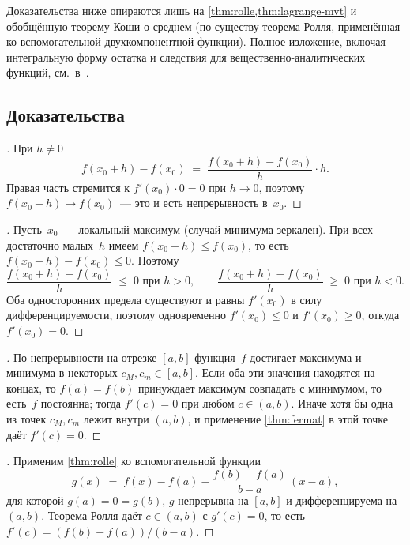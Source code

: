 \begin{remark}
Доказательства ниже опираются лишь на \cref{thm:rolle,thm:lagrange-mvt}
и обобщённую теорему Коши о среднем (по существу теорема Ролля,
применённая ко вспомогательной двухкомпонентной функции). Полное
изложение, включая интегральную форму остатка и следствия для
вещественно-аналитических функций, см.\ в~\cite{Zorich1981}.
\end{remark}

\subsection*{Доказательства}

\begin{proof}[]
При $h \neq 0$
\[
  f(x_0 + h) - f(x_0) \;=\; \frac{f(x_0 + h) - f(x_0)}{h} \cdot h.
\]
Правая часть стремится к $f'(x_0) \cdot 0 = 0$ при $h \to 0$, поэтому
$f(x_0 + h) \to f(x_0)$~--- это и есть непрерывность в~$x_0$.
\end{proof}

\begin{proof}[]
Пусть~$x_0$~--- локальный максимум (случай минимума зеркален). При
всех достаточно малых~$h$ имеем $f(x_0 + h) \le f(x_0)$, то есть
$f(x_0 + h) - f(x_0) \le 0$. Поэтому
\[
  \frac{f(x_0 + h) - f(x_0)}{h} \;\le\; 0 \text{ при } h > 0,
  \qquad
  \frac{f(x_0 + h) - f(x_0)}{h} \;\ge\; 0 \text{ при } h < 0.
\]
Оба односторонних предела существуют и равны $f'(x_0)$ в силу
дифференцируемости, поэтому одновременно $f'(x_0) \le 0$ и
$f'(x_0) \ge 0$, откуда $f'(x_0) = 0$.
\end{proof}

\begin{proof}[]
По непрерывности на отрезке $[a, b]$ функция~$f$ достигает максимума и
минимума в некоторых $c_M, c_m \in [a, b]$. Если оба эти значения
находятся на концах, то $f(a) = f(b)$ принуждает максимум совпадать с
минимумом, то есть~$f$ постоянна; тогда $f'(c) = 0$ при любом
$c \in (a, b)$. Иначе хотя бы одна из точек $c_M, c_m$ лежит внутри
$(a, b)$, и применение \cref{thm:fermat} в этой точке даёт $f'(c) = 0$.
\end{proof}

\begin{proof}[]
Применим \cref{thm:rolle} ко вспомогательной функции
\[
  g(x) \;=\; f(x) - f(a) - \frac{f(b) - f(a)}{b - a}\,(x - a),
\]
для которой $g(a) = 0 = g(b)$, $g$ непрерывна на $[a, b]$ и
дифференцируема на $(a, b)$. Теорема Ролля даёт $c \in (a, b)$ с
$g'(c) = 0$, то есть $f'(c) = (f(b) - f(a))/(b - a)$.
\end{proof}


